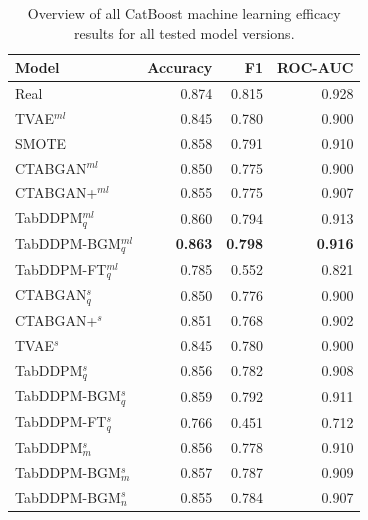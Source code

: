 \begin{table}[h]
	\centering
	\begin{tabular}{lrrr}
		\toprule
		\textbf{Model}        & \textbf{Accuracy} & \textbf{F1}    & \textbf{ROC-AUC} \\
		\midrule
		Real                  & 0.874              & 0.815          & 0.928            \\
		TVAE$^{ml}$           & 0.845              & 0.780          & 0.900            \\
		SMOTE                 & 0.858              & 0.791          & 0.910            \\
		CTABGAN$^{ml}$        & 0.850              & 0.775          & 0.900            \\
		CTABGAN+$^{ml}$       & 0.855              & 0.775          & 0.907            \\
		TabDDPM$^{ml}_q$      & 0.860              & 0.794          & 0.913            \\
		TabDDPM-BGM$^{ml}_q$  & \textbf{0.863}     & \textbf{0.798} & \textbf{0.916}   \\
		TabDDPM-FT$^{ml}_q$   & 0.785              & 0.552          & 0.821            \\
		CTABGAN$^{s}_q$       & 0.850              & 0.776          & 0.900            \\
		CTABGAN+$^{s}$        & 0.851              & 0.768          & 0.902            \\
		TVAE$^{s}$            & 0.845              & 0.780          & 0.900            \\
		TabDDPM$^{s}_q$       & 0.856              & 0.782          & 0.908            \\
		TabDDPM-BGM$^{s}_q$   & 0.859              & 0.792          & 0.911            \\
		TabDDPM-FT$^{s}_q$    & 0.766              & 0.451          & 0.712            \\
		TabDDPM$^{s}_m$       & 0.856              & 0.778          & 0.910            \\
		TabDDPM-BGM$^{s}_m$   & 0.857              & 0.787          & 0.909            \\
		TabDDPM-BGM$^{s}_{n}$ & 0.855              & 0.784          & 0.907            \\
		\bottomrule
	\end{tabular}
	\caption[Overview all ML-Efficacy results]{Overview of all CatBoost machine learning efficacy results for all tested model versions.}
	\label{tab:ml-all}
\end{table}


